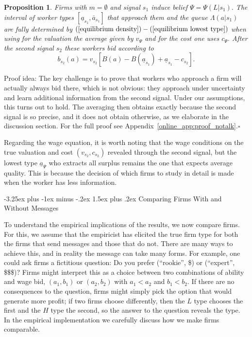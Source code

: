 \documentclass[12pt]{article}
\makeatletter
\renewcommand{\subsection}{%
  \@startsection{subsection}{2}{\z@}%
  {-3.25ex plus -1ex minus -.2ex}%
  {1.5ex plus .2ex}%
  {\normalfont\large\bfseries}%
}
\newtheorem{prop}{Proposition}
\makeatother
\begin{document}
\begin{prop}
\label{equilibrium-notalk}Firms with $m=\emptyset $ and signal $s_{1}$
induce belief $\Psi =\Psi (L|s_{1}).$ The interval of worker types $[%
\underline{a}_{s_{1}},\bar{a}_{s_{1}}]$ that approach them and the queue $%
\Lambda (a|s_{1})$ are fully determined by $(\ref{equilibrium density})-(\ref%
{equilibrium lowest type})$ when using for the valuation the average given
by $v_{\Psi }$ and for the cost one uses $c_{\Psi }.$ After the second
signal $s_{2}$ these workers bid according to%
\begin{equation}
b_{s_{2}}(a)=v_{s_{2}}[B(a)-B(\underline{a}_{s_{1}})+\underline{a}%
_{s_{1}}-c_{s_{2}}].  \label{wages-general}
\end{equation}
\end{prop}

Proof idea: The key challenge is to prove that workers who approach a firm will actually always bid there, which is not obvious: they approach under uncertainty and learn additional information from the second signal. Under our assumptions, this turns out to hold. The averaging then obtains exactly because the second signal is so precise, and it does not obtain otherwise, as we elaborate in the discussion section. For the full proof see Appendix~\ref{online_app:proof_notalk}.$\square$\bigskip

Regarding the wage equation, it is worth noting that the wage conditions on the true valuation and cost $(v_{s_{2}},c_{s_{2}})$ revealed through the second signal, but the lowest type $\underline{a}_{\Psi}$ who extracts all surplus remains the one that expects average quality. This is because the decision of which firms to study in detail is made when the worker has less information.


\subsection{Comparing Firms With and Without Messages}\label{sec:comparing}

To understand the empirical implications of the results, we now compare firms. For this, we assume that the empiricist has elicited the true firm type for both the firms that send messages and those that do not. There are many ways to achieve this, and in reality the message can take many forms. For example, one could ask firms a fictitious question: Do you prefer (``rookie'', \$) or (``expert'', \$\$\$)? Firms might interpret this as a choice between two combinations of ability and wage bid, $(a_{1},b_{1})$ or $(a_{2},b_{2})$ with $a_{1}<a_{2}$ and $b_{1}<b_{2}$. If there are no consequences to the question, firms might simply pick the option that would generate more profit; if two firms choose differently, then the $L$ type chooses the first and the $H$ type the second, so the answer to the question reveals the type. In the empirical implementation we carefully discuss how we make firms comparable.
\end{document}

